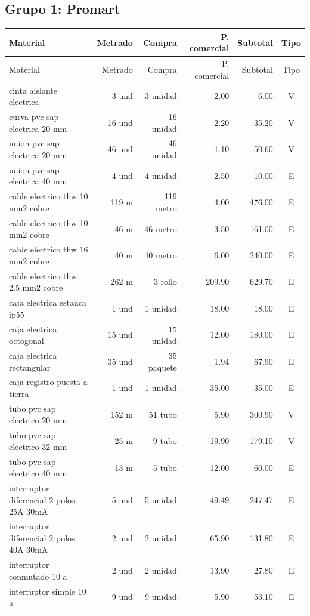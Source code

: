 \subsection{Grupo 1: Promart}
\scriptsize
\begin{longtable}{p{6.0cm}r r r r c}
\toprule Material & Metrado & Compra & P. comercial & Subtotal & Tipo \\ \midrule
\endfirsthead\toprule Material & Metrado & Compra & P. comercial & Subtotal & Tipo \\ \midrule\endhead
cinta aislante electrica & 3 und & 3 unidad & 2.00 & 6.00 & V \\
curva pvc sap electrica 20 mm & 16 und & 16 unidad & 2.20 & 35.20 & V \\
union pvc sap electrica 20 mm & 46 und & 46 unidad & 1.10 & 50.60 & V \\
union pvc sap electrica 40 mm & 4 und & 4 unidad & 2.50 & 10.00 & E \\
cable electrico thw 10 mm2 cobre & 119 m & 119 metro & 4.00 & 476.00 & E \\
cable electrico thw 10 mm2 cobre & 46 m & 46 metro & 3.50 & 161.00 & E \\
cable electrico thw 16 mm2 cobre & 40 m & 40 metro & 6.00 & 240.00 & E \\
cable electrico thw 2.5 mm2 cobre & 262 m & 3 rollo & 209.90 & 629.70 & E \\
caja electrica estanca ip55 & 1 und & 1 unidad & 18.00 & 18.00 & E \\
caja electrica octogonal & 15 und & 15 unidad & 12.00 & 180.00 & E \\
caja electrica rectangular & 35 und & 35 paquete & 1.94 & 67.90 & E \\
caja registro puesta a tierra & 1 und & 1 unidad & 35.00 & 35.00 & E \\
tubo pvc sap electrico 20 mm & 152 m & 51 tubo & 5.90 & 300.90 & V \\
tubo pvc sap electrico 32 mm & 25 m & 9 tubo & 19.90 & 179.10 & V \\
tubo pvc sap electrico 40 mm & 13 m & 5 tubo & 12.00 & 60.00 & E \\
interruptor diferencial 2 polos 25A 30mA & 5 und & 5 unidad & 49.49 & 247.47 & E \\
interruptor diferencial 2 polos 40A 30mA & 2 und & 2 unidad & 65.90 & 131.80 & E \\
interruptor conmutado 10 a & 2 und & 2 unidad & 13.90 & 27.80 & E \\
interruptor simple 10 a & 9 und & 9 unidad & 5.90 & 53.10 & E \\

\end{longtable}
